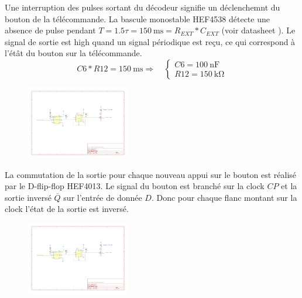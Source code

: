 \documentclass[french]{layout/Report}
\begin{document}
\begin{description}[leftmargin=!,labelwidth=4cm, labelindent=\parindent]
	\item[Détecteur d'interruption]
        Une interruption des pulses sortant du décodeur signifie un déclenchemnt du bouton de la télécommande.
        La bascule monostable HEF4538 détecte une absence de pulse pendant $T = 1.5 \tau = \SI{150}{\milli\second} = R_{EXT}*C_{EXT}$ (voir datasheet \cite{HEF4538}).
        Le signal de sortie est high quand un signal périodique est reçu, ce qui correspond à l'étât du bouton sur la télécommande.
        \begin{equation*}
            \mathit{C6}*\mathit{R12} = \SI{150}{\milli\second}
            \Rightarrow\quad
            \begin{cases}
                \mathit{C6} = \SI{100}{\nano\farad} \\
                \mathit{R12} = \SI{150}{\kilo\ohm}
            \end{cases}
        \end{equation*}

        \begin{figure}[H]
        \centering
        \includegraphics[width=0.4\textwidth]{fig/interrupt_detect.pdf}
        \end{figure}

    \item[Commutateur]
        La commutation de la sortie pour chaque nouveau appui sur le bouton est réalisé par le D-flip-flop HEF4013\cite{HEF4013}.
        Le signal du bouton est branché sur la clock $CP$ et la sortie inversé $\overline{Q}$ sur l'entrée de donnée $D$.
        Donc pour chaque flanc montant sur la clock l'état de la sortie est inversé.

        \begin{figure}[H]
        \centering
        \includegraphics[width=0.4\textwidth]{fig/commutator.pdf}
        \end{figure}


\end{description}
\end{document}
